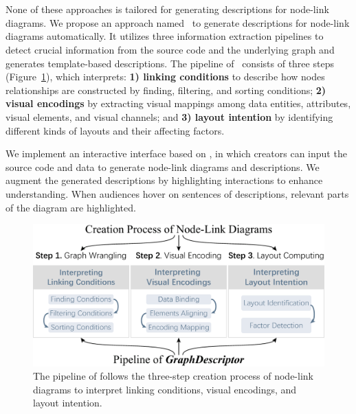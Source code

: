\section{\ApproachName}
None of these approaches is tailored for generating descriptions for node-link diagrams. 
We propose an approach named \ApproachName~to generate descriptions for node-link diagrams automatically.
It utilizes three information extraction pipelines to detect crucial information from the source code and the underlying graph and generates template-based descriptions.
The pipeline of \ApproachName~consists of three steps (Figure~\ref{fig:workflow}), which interprets:
\textbf{1) linking conditions} to describe how nodes relationships are constructed by finding, filtering, and sorting conditions;
\textbf{2) visual encodings} by extracting visual mappings among data entities, attributes, visual elements, and visual channels; and
\textbf{3) layout intention} by identifying different kinds of layouts and their affecting factors.

We implement an interactive interface based on \ApproachName, in which creators can input the source code and data to generate node-link diagrams and descriptions.
We augment the generated descriptions by highlighting interactions to enhance understanding.
When audiences hover on sentences of descriptions, relevant parts of the diagram are highlighted.

\begin{figure}
    \centering
    \includegraphics[width=1\columnwidth]{figures/workflow.eps}
    \caption{The pipeline of \textit{\ApproachName} follows the three-step creation process of node-link diagrams to interpret linking conditions, visual encodings, and layout intention.}
    \label{fig:workflow}
\end{figure}


